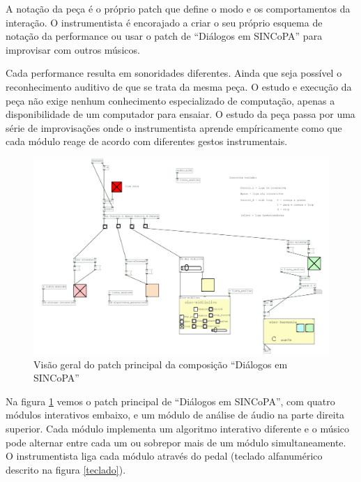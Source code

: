 \documentclass[draft]{ppgmus}
\begin{document}
A notação da peça é o próprio patch que define o modo e os comportamentos
da interação. O instrumentista é encorajado a criar o seu próprio esquema
de notação da performance ou usar o patch de ``Diálogos em SINCoPA'' para
improvisar com outros músicos.

Cada performance resulta em sonoridades diferentes. Ainda que seja possível o
reconhecimento auditivo de que se trata da mesma peça. O estudo e execução da peça
não exige nenhum conhecimento especializado de computação, apenas a disponibilidade de um 
computador para ensaiar. O estudo da peça passa por uma série de improvisações onde
o instrumentista aprende empíricamente como que cada módulo reage de acordo com
diferentes gestos instrumentais.

\begin{figure}
\includegraphics[scale=.4]{comp}
\caption{Visão geral do patch principal da composição ``Diálogos em SINCoPA''}
\label{comp}
\end{figure}

Na figura \ref{comp} vemos o patch principal de ``Diálogos em SINCoPA'', com quatro
módulos interativos embaixo, e um módulo de análise de áudio na parte direita superior.
Cada módulo implementa um algoritmo interativo diferente e o músico pode alternar 
entre cada um ou sobrepor mais de um módulo simultaneamente. O instrumentista
liga cada módulo através do pedal (teclado alfanumérico descrito na figura \ref{teclado}).
\end{document}

